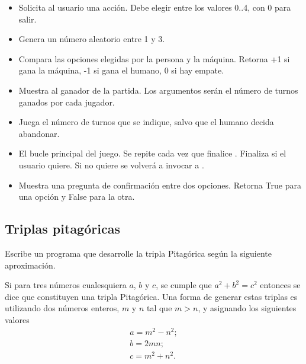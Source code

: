 \begin{itemize}
\item[]  Solicita al usuario una acción. Debe elegir entre los valores 0..4, con 0 para salir.

\item[]  Genera un número aleatorio entre 1 y 3.

\item[]  Compara las opciones elegidas por la persona y la máquina. Retorna +1 si gana la máquina, -1 si gana el humano, 0 si hay empate.

\item[]  Muestra al ganador de la partida. Los argumentos serán el número de turnos ganados por cada jugador.

\item[]  Juega el número de turnos que se indique, salvo que el humano decida abandonar.

\item[]  El bucle principal del juego. Se repite cada vez que finalice . Finaliza si el usuario quiere. Si no quiere se volverá a invocar a . 

\item[]  Muestra una pregunta de confirmación entre dos opciones. Retorna True para una opción y False para la otra.
\end{itemize}







\separacion
\subsection{Triplas pitagóricas}

Escribe un programa que desarrolle la tripla Pitagórica según la siguiente aproximación. 

Si para tres números cualesquiera $a$, $b$ y $c$, se cumple que $a^2 + b^2 = c^2 $ entonces se dice que constituyen una tripla Pitagórica. Una forma de generar estas triplas es utilizando dos números enteros, $m$ y $n$ tal que $m > n$, y asignando los siguientes valores
$$
\begin{array}{l}
a = m^2 - n^2; \\
b = 2mn; \\
 c = m^2 + n^2. 
 \end{array}
$$

